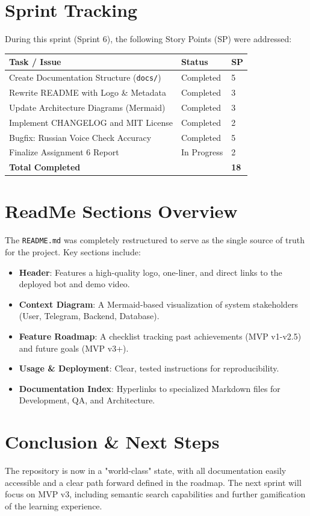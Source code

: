 \documentclass[12pt,a4paper]{article}
\begin{document}
\section{Sprint Tracking}
During this sprint (Sprint 6), the following Story Points (SP) were addressed:

\begin{longtable}{@{}p{}p{}p{}@{}}
\toprule
\textbf{Task / Issue} & \textbf{Status} & \textbf{SP} \\ \midrule
Create Documentation Structure (\texttt{docs/}) & Completed & 5 \\
Rewrite README with Logo \& Metadata & Completed & 3 \\
Update Architecture Diagrams (Mermaid) & Completed & 3 \\
Implement CHANGELOG and MIT License & Completed & 2 \\
Bugfix: Russian Voice Check Accuracy & Completed & 5 \\
Finalize Assignment 6 Report & In Progress & 2 \\
\midrule
\textbf{Total Completed} & & \textbf{18} \\
\bottomrule
\end{longtable}

\section{ReadMe Sections Overview}
The \texttt{README.md} was completely restructured to serve as the single source of truth for the project. Key sections include:

\begin{itemize}
    \item \textbf{Header}: Features a high-quality logo, one-liner, and direct links to the deployed bot and demo video.
    \item \textbf{Context Diagram}: A Mermaid-based visualization of system stakeholders (User, Telegram, Backend, Database).
    \item \textbf{Feature Roadmap}: A checklist tracking past achievements (MVP v1-v2.5) and future goals (MVP v3+).
    \item \textbf{Usage \& Deployment}: Clear, tested instructions for reproducibility.
    \item \textbf{Documentation Index}: Hyperlinks to specialized Markdown files for Development, QA, and Architecture.
\end{itemize}

\section{Conclusion \& Next Steps}
The repository is now in a "world-class" state, with all documentation easily accessible and a clear path forward defined in the roadmap. The next sprint will focus on MVP v3, including semantic search capabilities and further gamification of the learning experience.
\end{document}
